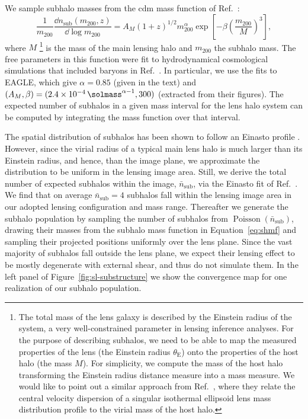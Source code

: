 We sample subhalo masses from the \gls*{cdm} mass function of Ref.~\cite{Giocoli:2009ie}:
\begin{equation} \label{eq:shmf}
    \frac{1}{m_\mathrm{200}}\frac{\dd n_\mathrm{sub}( m_\mathrm{200}, z)}{\dd\log m_\mathrm{200}} = A_M (1+z)^{1/2}m_{200}^{\alpha} \exp\left[-\beta\left(\frac{m_\mathrm{200}}{M}\right)^3 \right],
\end{equation}
where $M$ \footnote{
    The total mass of the lens galaxy is described by the Einstein radius of the system, a very well-constrained parameter in lensing inference analyses. For the purpose of describing subhalos, we need to be able to map the measured properties of the lens (the Einstein radius $\theta_\mathrm{E}$) onto the properties of the host halo (the mass $M$). For simplicity, we compute the mass of the host halo transforming the Einstein radius distance measure into a mass measure. We would like to point out a similar approach from Ref.~\cite{Brehmer:2019jyt}, where they relate the central velocity dispersion of a singular isothermal ellipsoid lens mass distribution profile to the virial mass of the host halo.
}  is the mass of the main lensing halo and $m_\mathrm{200}$ the subhalo mass. The free parameters in this function were fit to hydrodynamical cosmological simulations that included baryons in Ref.~\cite{Despali:2016meh}. In particular, we use the fits to EAGLE, which give $\alpha = 0.85$ (given in the text) and $(A_M, \beta) = (2.4\times10^{-4}\, \si{\solmass}^{\alpha - 1}, 300)$ (extracted from their figures). The expected number of subhalos in a given mass interval for the lens halo system can be computed by integrating the mass function over that interval.

The spatial distribution of subhalos has been shown to follow an Einasto profile \cite{Springel:2008cc}. However, since the virial radius of a typical main lens halo is much larger than its Einstein radius, and hence, than the image plane, we approximate the distribution to be uniform in the lensing image area. Still, we derive the total number of expected subhalos within the image,  $\bar{n}_\mathrm{sub}$,  via the Einasto fit of Ref.~\cite{Despali:2016meh}. We find that on average $\bar{n}_\mathrm{sub}=4$ subhalos fall within the lensing image area in our adopted lensing configuration and mass range. %
Thereafter we generate the subhalo population by sampling the number of subhalos from $\operatorname{Poisson}(\bar{n}_\mathrm{sub})$, drawing their masses from the subhalo mass function in Equation~\eqref{eq:shmf} and sampling their projected positions uniformly over the lens plane. Since the vast majority of subhalos fall outside the lens plane, we expect their lensing effect to be mostly degenerate with external shear, and thus do not simulate them. In the left panel of Figure~\ref{fig:sl-substructure} we show the convergence map for one realization of our subhalo population.

